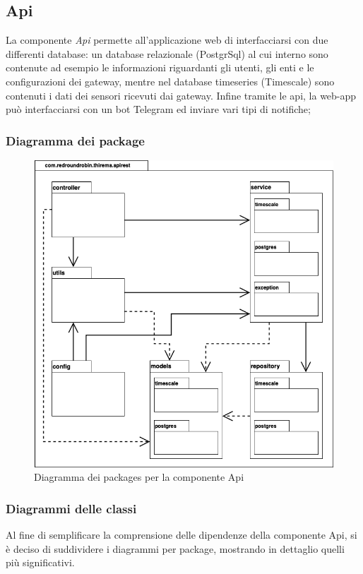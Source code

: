\subsection{Api}
	La componente \textit{Api} permette all'applicazione web di interfacciarsi con due differenti database: un database relazionale (PostgrSql) al cui interno sono contenute ad esempio le informazioni riguardanti gli utenti, gli enti e le configurazioni dei gateway, mentre nel database timeseries (Timescale) sono contenuti i dati dei sensori ricevuti dai gateway.
	Infine tramite le api, la web-app può interfacciarsi con un bot Telegram ed inviare vari tipi di notifiche;
	\subsubsection{Diagramma dei package}%
		\begin{figure}[H]
			\centering
			\includegraphics[scale=0.500]{res/images/API/packageAPI.png}
			\caption{Diagramma dei packages per la componente Api}
		\end{figure}

	\subsubsection{Diagrammi delle classi}%
		Al fine di semplificare la comprensione delle dipendenze della componente Api, si è deciso di suddividere i diagrammi per package, mostrando in dettaglio quelli più significativi.

